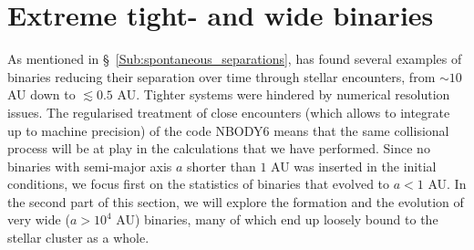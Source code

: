 %
% 
%
%
%
%

\section{Extreme tight-  and wide binaries}

As mentioned in \S~\ref{Sub:spontaneous_separations}, \cite{Bate2012} has found several examples of binaries reducing their separation over time through stellar encounters, from $\sim 10 $ AU down to $ \lesssim 0.5 $ AU. Tighter systems were hindered by numerical resolution issues. The regularised treatment of close encounters (which allows to integrate up to machine precision) of the code NBODY6 means that the same collisional process will be at play in the calculations that we have performed. Since no binaries with semi-major axis $a$  shorter than $ 1 $ AU was inserted in the initial conditions, we focus first on the statistics of binaries that evolved to $a < 1 $ AU. In the second part of this section, we will explore the formation and the evolution of very wide ($a > 10^4$ AU) binaries, many of which end up loosely bound to the stellar cluster  as a whole.   

